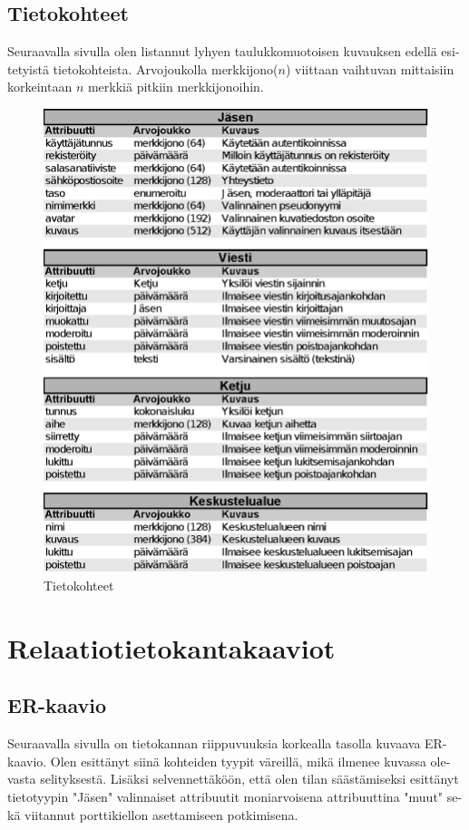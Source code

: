 \documentclass[11pt]{article}
\begin{document}
	\subsection{Tietokohteet} Seuraavalla sivulla olen listannut lyhyen taulukkomuotoisen kuvauksen edellä
		esi-tetyistä tietokohteista. Arvojoukolla merkkijono($n$) viittaan vaihtuvan mittaisiin korkeintaan
		$n$ merkkiä pitkiin merkkijonoihin.
	
		\newpage
		\thispagestyle{plain}
		
		\begin{figure}[H]
			\includegraphics{tietokohteet.eps}
			\caption{Tietokohteet}
		\end{figure}
		
\newpage
\thispagestyle{plain}		
	\section{Relaatiotietokantakaaviot}
		\subsection{ER-kaavio} Seuraavalla sivulla on tietokannan riippuvuuksia korkealla tasolla kuvaava
		ER-kaavio. Olen esittänyt siinä kohteiden tyypit väreillä, mikä ilmenee kuvassa ole-vasta selityksestä.
		Lisäksi selvennettäköön, että olen tilan säästämiseksi esittänyt tietotyypin "Jäsen" valinnaiset
		attribuutit moniarvoisena attribuuttina "muut" se-kä viitannut porttikiellon asettamiseen potkimisena.
		
\end{document}

